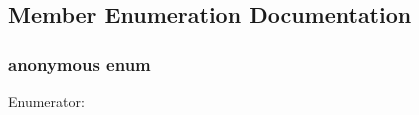 \subsection{Member Enumeration Documentation}
\hypertarget{classmatter_a7dbeb62589b018c950f7025b93a2f75c}{
\subsubsection[{"@32}]{\setlength{\rightskip}{0pt plus 5cm}anonymous enum}}
\label{classmatter_a7dbeb62589b018c950f7025b93a2f75c}
\begin{Desc}
\item[Enumerator: ]\par
\begin{description}
\item[{\em 
\hypertarget{classmatter_a7dbeb62589b018c950f7025b93a2f75ca34d772285f7fb06e6efb36d78b928b93}{
maxConnections}
\label{classmatter_a7dbeb62589b018c950f7025b93a2f75ca34d772285f7fb06e6efb36d78b928b93}
}]\end{description}
\end{Desc}



